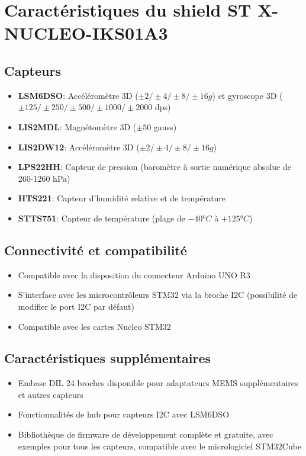 \documentclass[12pt]{article}
\begin{document}
\section{Caractéristiques du shield ST X-NUCLEO-IKS01A3}

\subsection{Capteurs}
\begin{itemize}
    \item \textbf{LSM6DSO}: Accéléromètre 3D ($\pm2/\pm4/\pm8/\pm16g$) et gyroscope 3D ($\pm125/\pm250/\pm500/\pm1000/\pm2000$ dps)
    \item \textbf{LIS2MDL}: Magnétomètre 3D ($\pm50$ gauss)
    \item \textbf{LIS2DW12}: Accéléromètre 3D ($\pm2/\pm4/\pm8/\pm16g$)
    \item \textbf{LPS22HH}: Capteur de pression (baromètre à sortie numérique absolue de 260-1260 hPa)
    \item \textbf{HTS221}: Capteur d'humidité relative et de température
    \item \textbf{STTS751}: Capteur de température (plage de $-40°C$ à $+125°C$)
\end{itemize}

\subsection{Connectivité et compatibilité}
\begin{itemize}
    \item Compatible avec la disposition du connecteur Arduino UNO R3
    \item S'interface avec les microcontrôleurs STM32 via la broche I2C (possibilité de modifier le port I2C par défaut)
    \item Compatible avec les cartes Nucleo STM32
\end{itemize}

\subsection{Caractéristiques supplémentaires}
\begin{itemize}
    \item Embase DIL 24 broches disponible pour adaptateurs MEMS supplémentaires et autres capteurs
    \item Fonctionnalités de hub pour capteurs I2C avec LSM6DSO
    \item Bibliothèque de firmware de développement complète et gratuite, avec exemples pour tous les capteurs, compatible avec le micrologiciel STM32Cube
\end{itemize}
\end{document}
